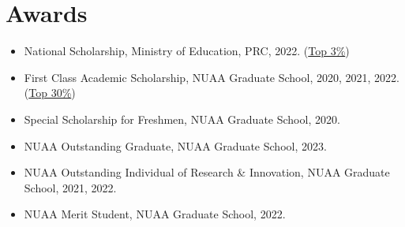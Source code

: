 \documentclass[letterpaper,11pt]{article}
\newcommand{\resumeSubHeadingListStart}{\begin{itemize}[leftmargin=*]}
\newcommand{\resumeSubHeadingListEnd}{\end{itemize}}
\begin{document}
\section{Awards}
  \resumeSubHeadingListStart
    \item{
      National Scholarship, Ministry of Education, PRC, 2022. (\textcolor[rgb]{1.00,0.00,0.00}{\underline{Top 3\%}})
    }
    \item{
       First Class Academic Scholarship, NUAA Graduate School, 2020, 2021, 2022. (\textcolor[rgb]{1.00,0.00,0.00}{\underline{Top 30\%}})
    }
    \item{
       Special Scholarship for Freshmen, NUAA Graduate School, 2020.
    }
	\item{
		NUAA Outstanding Graduate, NUAA Graduate School, 2023.
	}
    \item{
       NUAA Outstanding Individual of Research \& Innovation, NUAA Graduate School, 2021, 2022.
    }
    \item{
       NUAA Merit Student, NUAA Graduate School, 2022.
    }
  \resumeSubHeadingListEnd


\end{document}

